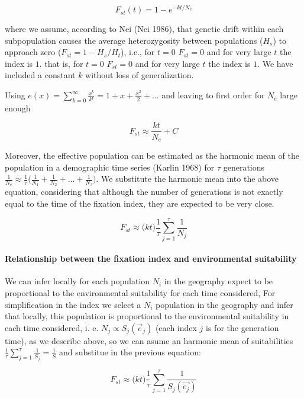 \documentclass[
]{article}
\begin{document}
\[
F_{st}(t) = 1 - e^{-kt/N_e } 
\]

where we assume, according to Nei (Nei 1986), that genetic drift within
each subpopulation causes the average heterozygosity between populations
(\(H_s\)) to approach zero (\(F_{st} = 1 - H_s/H_t\)), i.e., for \(t=0\)
\(F_{st} = 0\) and for very large \(t\) the index is \(1\). that is, for
\(t=0\) \(F_{st} = 0\) and for very large \(t\) the index is \(1\). We
have included a constant \(k\) without loss of generalization.

Using
\(e(x) = \sum_{k=0}^{\infty} \frac{x^k}{k!} = 1 + x + \frac{x^2}{2} + ...\)
and leaving to first order for \(N_e\) large enough

\[
F_{st} \approx \frac{kt}{N_e} + C
\]

Moreover, the effective population can be estimated as the harmonic mean
of the population in a demographic time series (Karlin 1968) for
\(\tau\) generations
\(\frac{1}{N_e} \approx \frac{1}{\tau}\Big({\frac{1}{N_1} + \frac{1}{N_2} + ... + \frac{1}{N_\tau} } \Big)\).
We substitute the harmonic mean into the above equation, considering
that although the number of generations is not exactly equal to the time
of the fixation index, they are expected to be very close.

\[
F_{st} \approx \Big (kt\Big)  \frac{1}{\tau}\sum_{j=1}^{\tau}\frac{1}{N_j} 
\]

\hypertarget{relationship-between-the-fixation-index-and-environmental-suitability}{%
\paragraph{Relationship between the fixation index and environmental
suitability}\label{relationship-between-the-fixation-index-and-environmental-suitability}}

We can infer locally for each population \(N_i\) in the geography expect
to be proportional to the environmental suitability for each time
considered, For simplification in the index we select a \(N_i\)
population in the geography and infer that locally, this population is
proportional to the environmental suitability in each time considered,
i. e. \(N_{j} \propto S_{j}(\vec{e}_{j})\) (each index \(j\) is for the
generation time), as we describe above, so we can asume an harmonic mean
of suitabilities
\(\frac{1}{\tau}\sum_{j = 1}^{\tau} \frac{1}{S_j} = \frac{1}{S}\) and
substitue in the previous equation:

\[
F_{st} \approx \Big (kt\Big)  \frac{1}{\tau}\sum_{j=1}^{\tau}\frac{1}{S_j(\vec{e_j})}
\]
\end{document}
